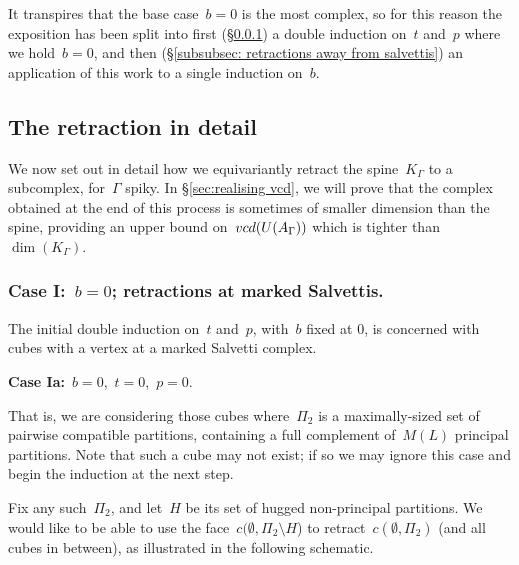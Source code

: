 \documentclass[11pt]{amsart}
\theoremstyle{definition}
\theoremstyle{definition}
\theoremstyle{definition}
\theoremstyle{definition}
\newcommand{\vcduag}{\textsc{vcd}(U(A_{\Gamma}))} %
\newcommand{\spine}{K_{\Gamma}} %
\begin{document}
It transpires that the base case~$b = 0$ is the most complex, so for this reason the exposition has been split into first (\S\ref{subsubsec: retractions at salvettis}) a double induction on~$t$ and~$p$ where we hold~$b = 0$, and then (\S\ref{subsubsec: retractions away from salvettis}) an application of this work to a single induction on~$b$.

\subsection*{The retraction in detail}

We now set out in detail how we equivariantly retract the spine~$\spine$ to a subcomplex, for~$\Gamma$ spiky. In \S\ref{sec:realising vcd}, we will prove that the complex obtained at the end of this process is sometimes of smaller dimension than the spine, providing an upper bound on~$\vcduag$ which is tighter than~$\dim(\spine)$.

\subsubsection{\textbf{Case I:}~$b = 0$; retractions at marked Salvettis. \\}\label{subsubsec: retractions at salvettis}

The initial double induction on~$t$ and~$p$, with~$b$ fixed at 0, is concerned with cubes with a vertex at a marked Salvetti complex. 

\textbf{Case Ia:}~$b = 0$,~$t = 0$,~$p = 0$. 

That is, we are considering those cubes where~$\Pi_2$ is a maximally-sized set of pairwise compatible partitions, containing a full complement of~$M(L)$ principal partitions. Note that such a cube may not exist; if so we may ignore this case and begin the induction at the next step.

Fix any such~$\Pi_2$, and let~$H$ be its set of hugged non-principal partitions. We would like to be able to use the face~$c(\emptyset, \Pi_2 \setminus H$) to retract~$c(\emptyset, \Pi_2)$ (and all cubes in between), as illustrated in the following schematic.
\end{document}
